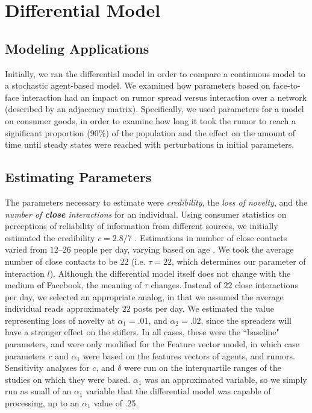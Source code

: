 \section{Differential Model }
\label{sec:diffmodel}

\subsection{Modeling Applications}
\label{subsec:diffmodeapp}

Initially, we ran the differential model in order to compare a continuous model to a stochastic agent-based model. We examined how parameters based on face-to-face interaction had an impact on rumor spread versus interaction over a network (described by an adjacency matrix). Specifically, we used parameters for a model on consumer goods, in order to examine how long it took the rumor to reach a significant proportion (90\%) of the population and the effect on the amount of time until steady states were reached with perturbations in initial parameters.

\subsection{Estimating Parameters}
\label{subsec:diffmodeeparam}

The parameters necessary to estimate were \textit{credibility}, the
\textit{loss of novelty}, and the \textit{number of \textbf{close} interactions} for an individual. Using consumer statistics on perceptions of reliability of information from different sources, we initially estimated the credibility $ c = 2.8/7 $ \cite{kamins-1997}. Estimations in number of close contacts varied from $ 12 $--$ 26 $ people per day, varying based on age \cite{cahill-1996, mossong-2008, edmunds-2006}. We took the average number of close contacts to be $ 22 $ (i.e. $ \tau = 22 $, which determines our parameter of interaction $ l $). Although the differential model itself does not change with the medium of Facebook, the meaning of $ \tau $ changes. Instead of $ 22 $ close interactions per day, we selected an appropriate analog, in that we assumed the average individual reads approximately $ 22 $ posts per day. We estimated the value representing loss of novelty at $ \alpha_1 = .01 $, and  $ \alpha_2 = .02 $, since the spreaders will have a stronger effect on the stiflers.
In all cases, these were the ``baseline" parameters, and were only modified for the Feature vector model, in which case parameters $ c $ and $ \alpha_1 $  were based on the features vectors of agents, and rumors. Sensitivity analyses for $ c $, and $ \delta $ were run on the interquartile ranges of the studies on which they were based. $ \alpha_1 $ was an approximated variable, so we simply run as small of an $ \alpha_1 $ variable that the differential model was capable of processing, up to an $ \alpha_1 $ value of .25.
